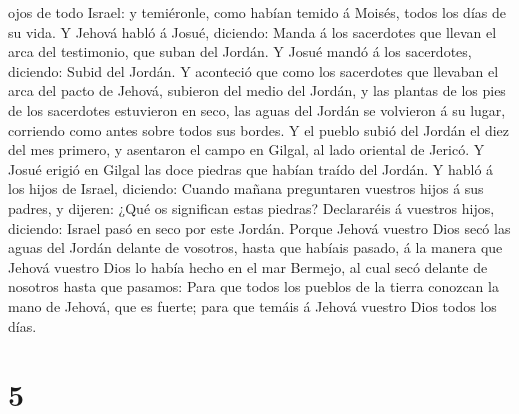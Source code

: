 ojos de todo Israel: y temiéronle, como habían temido á Moisés, todos
los días de su vida.  Y Jehová habló á Josué, diciendo:
 Manda á los sacerdotes que llevan el arca del
testimonio, que suban del Jordán.  Y Josué mandó á los
sacerdotes, diciendo: Subid del Jordán.  Y aconteció que
como los sacerdotes que llevaban el arca del pacto de Jehová, subieron
del medio del Jordán, y las plantas de los pies de los sacerdotes
estuvieron en seco, las aguas del Jordán se volvieron á su lugar,
corriendo como antes sobre todos sus bordes.  Y el pueblo
subió del Jordán el diez del mes primero, y asentaron el campo en
Gilgal, al lado oriental de Jericó.  Y Josué erigió en
Gilgal las doce piedras que habían traído del Jordán.  Y
habló á los hijos de Israel, diciendo: Cuando mañana preguntaren
vuestros hijos á sus padres, y dijeren: ¿Qué os significan estas
piedras?  Declararéis á vuestros hijos, diciendo: Israel
pasó en seco por este Jordán.  Porque Jehová vuestro Dios
secó las aguas del Jordán delante de vosotros, hasta que habíais pasado,
á la manera que Jehová vuestro Dios lo había hecho en el mar Bermejo, al
cual secó delante de nosotros hasta que pasamos:  Para
que todos los pueblos de la tierra conozcan la mano de Jehová, que es
fuerte; para que temáis á Jehová vuestro Dios todos los días.

\hypertarget{section-4}{%
\section{5}\label{section-4}}

